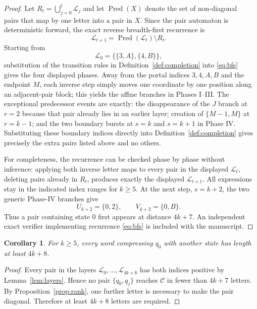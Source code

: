 \documentclass[11pt]{article}
\newtheorem{corollary}{Corollary}
\theoremstyle{definition}
\theoremstyle{remark}
\newcommand{\pair}[2]{\{q_{#1},q_{#2}\}}
\begin{document}
\begin{proof}
Let $R_t=\bigcup_{j=0}^{t}\mathcal L_j$ and let $\operatorname{Pred}(X)$ denote the set of non-diagonal pairs that map by one letter into a pair in $X$. Since the pair automaton is deterministic forward, the exact reverse breadth-first recurrence is
\[
 \mathcal L_{t+1}=\operatorname{Pred}(\mathcal L_t)\setminus R_t.
 \tag{1}\label{eq:bfs}
\]
Starting from
\[
\mathcal L_0=\{\{3,A\},\{4,B\}\},
\]
substitution of the transition rules in Definition~\ref{def:completion} into \eqref{eq:bfs} gives the four displayed phases. Away from the portal indices $3,4,A,B$ and the endpoint $M$, each inverse step simply moves one coordinate by one position along an adjacent-pair block; this yields the affine branches in Phases I--III. The exceptional predecessor events are exactly: the disappearance of the $J$ branch at $r=2$ because that pair already lies in an earlier layer; creation of $\{M-1,M\}$ at $r=k-1$; and the two boundary bursts at $s=k$ and $s=k+1$ in Phase IV. Substituting these boundary indices directly into Definition~\ref{def:completion} gives precisely the extra pairs listed above and no others.

For completeness, the recurrence can be checked phase by phase without inference: applying both inverse letter maps to every pair in the displayed $\mathcal L_t$, deleting pairs already in $R_t$, produces exactly the displayed $\mathcal L_{t+1}$. All expressions stay in the indicated index ranges for $k\ge5$. At the next step, $s=k+2$, the two generic Phase-IV branches give
\[
 U_{k+2}=\{0,2\},\qquad V_{k+2}=\{0,B\}.
\]
Thus a pair containing state $0$ first appears at distance $4k+7$. An independent exact verifier implementing recurrence \eqref{eq:bfs} is included with the manuscript.
\end{proof}

\begin{corollary}\label{cor:lower}
For $k\ge5$, every word compressing $q_0$ with another state has length at least $4k+8$.
\end{corollary}

\begin{proof}
Every pair in the layers $\mathcal L_0,\ldots,\mathcal L_{4k+6}$ has both indices positive by Lemma~\ref{lem:layers}. Hence no pair $\pair{0}{j}$ reaches $\mathcal C$ in fewer than $4k+7$ letters. By Proposition~\ref{prop:rank}, one further letter is necessary to make the pair diagonal. Therefore at least $4k+8$ letters are required.
\end{proof}
\end{document}
